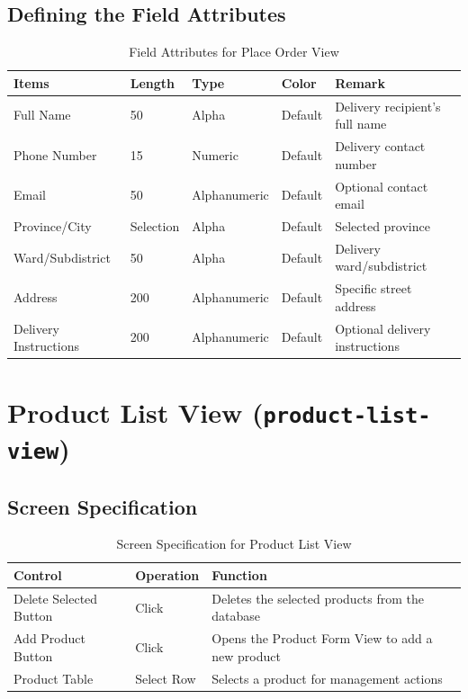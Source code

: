 \documentclass{article}
\begin{document}
\subsection{Defining the Field Attributes}
\begin{table}[h!]
\centering
\begin{tabularx}{\textwidth}{|l|l|l|l|X|}
\hline
\textbf{Items} & \textbf{Length} & \textbf{Type} & \textbf{Color} & \textbf{Remark} \\
\hline
Full Name & 50 & Alpha & Default & Delivery recipient's full name \\
\hline
Phone Number & 15 & Numeric & Default & Delivery contact number \\
\hline
Email & 50 & Alphanumeric & Default & Optional contact email \\
\hline
Province/City & Selection & Alpha & Default & Selected province \\
\hline
Ward/Subdistrict & 50 & Alpha & Default & Delivery ward/subdistrict \\
\hline
Address & 200 & Alphanumeric & Default & Specific street address \\
\hline
Delivery Instructions & 200 & Alphanumeric & Default & Optional delivery instructions \\
\hline
\end{tabularx}
\caption{Field Attributes for Place Order View}
\end{table}

\section{Product List View (\texttt{product-list-view})}
\subsection{Screen Specification}
\begin{table}[h!]
\centering
\begin{tabularx}{\textwidth}{|l|l|X|}
\hline
\textbf{Control} & \textbf{Operation} & \textbf{Function} \\
\hline
Delete Selected Button & Click & Deletes the selected products from the database \\
\hline
Add Product Button & Click & Opens the Product Form View to add a new product \\
\hline
Product Table & Select Row & Selects a product for management actions \\
\hline
\end{tabularx}
\caption{Screen Specification for Product List View}
\end{table}
\end{document}
